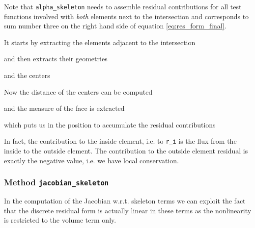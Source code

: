 \documentclass[a4paper,12pt]{article}
\begin{document}
Note that \lstinline{alpha_skeleton} needs to assemble 
residual contributions for all test functions involved with \textit{both}
elements next to the intersection and corresponds
to sum number three on the right hand side of equation \eqref{eq:res_form_final}.

It starts by extracting the elements adjacent to the intersection

and then extracts their geometries

and the centers

Now the distance of the centers can be computed

and the measure of the face is extracted

which puts us in the position to accumulate the residual contributions

In fact, the contribution to the inside element, i.e. to \lstinline{r_i} is the flux from the
inside to the outside element. The contribution to the outside 
element residual is exactly the negative value, i.e. we have local conservation.

\subsubsection*{Method \lstinline{jacobian_skeleton}}

In the computation of the Jacobian w.r.t. skeleton terms
we can exploit the fact that the discrete residual form is
actually linear in these terms as the nonlinearity is restricted to the
volume term only.
\end{document}
